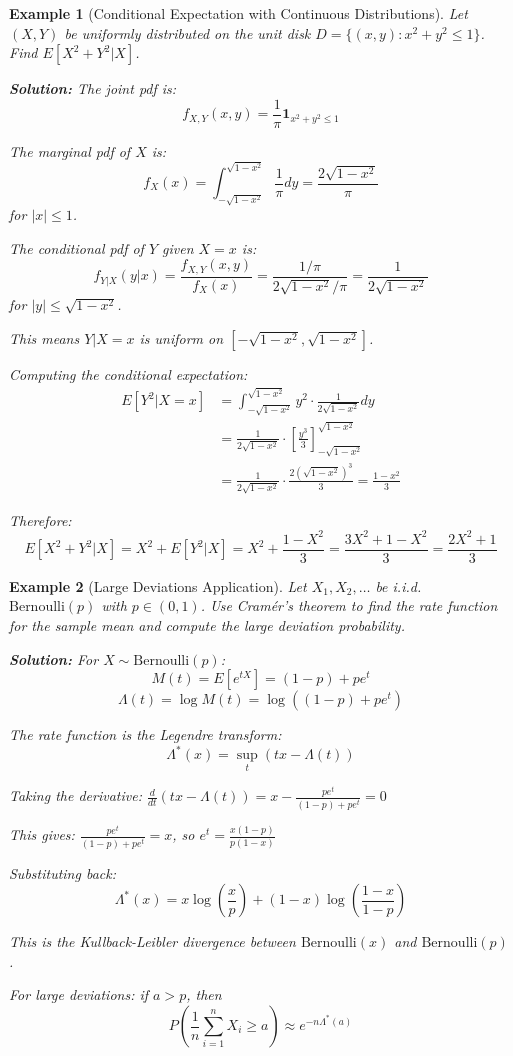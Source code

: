 \documentclass[12pt,a4paper]{article}
\newtheorem{example}{Example}[section]
\theoremstyle{remark}
\begin{document}
\begin{example}[Conditional Expectation with Continuous Distributions]
Let $(X, Y)$ be uniformly distributed on the unit disk $D = \{(x,y): x^2 + y^2 \leq 1\}$. Find $E[X^2 + Y^2 | X]$.

\textbf{Solution:}
The joint pdf is:
$$f_{X,Y}(x,y) = \frac{1}{\pi} \mathbf{1}_{x^2 + y^2 \leq 1}$$

The marginal pdf of $X$ is:
$$f_X(x) = \int_{-\sqrt{1-x^2}}^{\sqrt{1-x^2}} \frac{1}{\pi} dy = \frac{2\sqrt{1-x^2}}{\pi}$$
for $|x| \leq 1$.

The conditional pdf of $Y$ given $X = x$ is:
$$f_{Y|X}(y|x) = \frac{f_{X,Y}(x,y)}{f_X(x)} = \frac{1/\pi}{2\sqrt{1-x^2}/\pi} = \frac{1}{2\sqrt{1-x^2}}$$
for $|y| \leq \sqrt{1-x^2}$.

This means $Y|X = x$ is uniform on $[-\sqrt{1-x^2}, \sqrt{1-x^2}]$.

Computing the conditional expectation:
\begin{align}
E[Y^2|X = x] &= \int_{-\sqrt{1-x^2}}^{\sqrt{1-x^2}} y^2 \cdot \frac{1}{2\sqrt{1-x^2}} dy\\
&= \frac{1}{2\sqrt{1-x^2}} \cdot \left[\frac{y^3}{3}\right]_{-\sqrt{1-x^2}}^{\sqrt{1-x^2}}\\
&= \frac{1}{2\sqrt{1-x^2}} \cdot \frac{2(\sqrt{1-x^2})^3}{3} = \frac{1-x^2}{3}
\end{align}

Therefore:
$$E[X^2 + Y^2 | X] = X^2 + E[Y^2|X] = X^2 + \frac{1-X^2}{3} = \frac{3X^2 + 1 - X^2}{3} = \frac{2X^2 + 1}{3}$$
\end{example}

\begin{example}[Large Deviations Application]
Let $X_1, X_2, \ldots$ be i.i.d. $\text{Bernoulli}(p)$ with $p \in (0,1)$. Use Cramér's theorem to find the rate function for the sample mean and compute the large deviation probability.

\textbf{Solution:}
For $X \sim \text{Bernoulli}(p)$:
$$M(t) = E[e^{tX}] = (1-p) + pe^t$$
$$\Lambda(t) = \log M(t) = \log((1-p) + pe^t)$$

The rate function is the Legendre transform:
$$\Lambda^*(x) = \sup_t (tx - \Lambda(t))$$

Taking the derivative: $\frac{d}{dt}(tx - \Lambda(t)) = x - \frac{pe^t}{(1-p) + pe^t} = 0$

This gives: $\frac{pe^t}{(1-p) + pe^t} = x$, so $e^t = \frac{x(1-p)}{p(1-x)}$

Substituting back:
$$\Lambda^*(x) = x\log\left(\frac{x}{p}\right) + (1-x)\log\left(\frac{1-x}{1-p}\right)$$

This is the Kullback-Leibler divergence between $\text{Bernoulli}(x)$ and $\text{Bernoulli}(p)$.

For large deviations: if $a > p$, then
$$P\left(\frac{1}{n}\sum_{i=1}^n X_i \geq a\right) \approx e^{-n\Lambda^*(a)}$$
\end{example}
\end{document}
